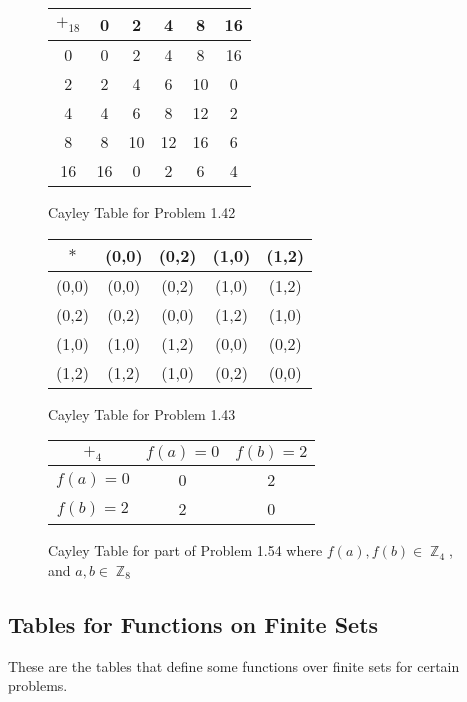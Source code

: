\documentclass{amsbook}
\DeclareMathOperator{\Z}{\mathbb{Z}}
\begin{document}
		\begin{figure}[h]
			\begin{tabular}{c|ccccc}
				$+_{18}$ & 0 & 2 & 4 & 8 & 16 \\
				\hline
				0  & \color{red} 0 \color{black}  & 2  & 4  & 8  & 16 \\
				2  & 2  & 4  & 6  & 10 & \color{red} 0 \color{black} \\
				4  & 4  & 6  & 8  & 12 & 2 \\
				8  & 8  & 10 & 12 & 16 & 6 \\
				16 & 16 & \color{red} 0 \color{black}  & 2  & 6  & 4
			\end{tabular}
			\caption{Cayley Table for Problem 1.42}
			\label{142CT}
		\end{figure}

		\begin{figure}[h]
			\begin{tabular}{c|cccc}
				$*$ & (0,0) & (0,2) & (1,0) & (1,2) \\
				\hline
				(0,0) & \color{red} (0,0) \color{black} & (0,2) & (1,0) & (1,2) \\
				(0,2) & (0,2) & \color{red} (0,0) \color{black} & (1,2) & (1,0) \\
				(1,0) & (1,0) & (1,2) & \color{red} (0,0) \color{black} & (0,2) \\
				(1,2) & (1,2) & (1,0) & (0,2) & \color{red} (0,0) \color{black}
			\end{tabular}
			\caption{Cayley Table for Problem 1.43}
			\label{143CT}
		\end{figure}

		\begin{figure}[h]
			\begin{tabular}{c|cc}
				$+_{4}$ & $f(a) = 0$ & $f(b) = 2$ \\
				\hline
				$f(a) = 0$ & 0 & 2 \\
				$f(b) = 2$ & 2 & 0
			\end{tabular}
			\caption{Cayley Table for part of Problem 1.54 where $f(a),f(b) \in \Z_{4}$, and $a,b \in \Z_{8}$}
			\label{154CT}
		\end{figure}

		\subsection{Tables for Functions on Finite Sets}
		\label{sub:tables_for_functions_on_finite_sets}
		These are the tables that define some functions over finite sets for certain problems.\\
\end{document}
